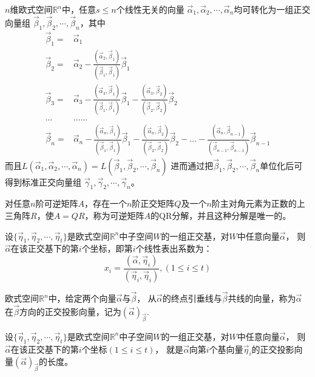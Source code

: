 \begin{thm}
$n$维欧式空间$\mathbb{R}^n$中，任意$s\leq n$个线性无关的向量
$\vec{\alpha}_1,\vec{\alpha}_2,\cdots,\vec{\alpha}_n$均可转化为一组正交向量组
$\vec{\beta}_1,\vec{\beta}_2,\cdots,\vec{\beta}_n$，其中
\begin{align*}
\vec{\beta}_1=&\vec{\alpha}_1\\
\vec{\beta}_2=&\vec{\alpha}_2-\frac{(\vec{\alpha}_2,\vec{\beta}_1)}{(\vec{\beta}_1,\vec{\beta}_1)}\vec{\beta}_1\\
\vec{\beta}_3=&\vec{\alpha}_3-\frac{(\vec{\alpha}_3,\vec{\beta}_1)}{(\vec{\beta}_1,\vec{\beta}_1)}\vec{\beta}_1-
              \frac{(\vec{\alpha}_3,\vec{\beta}_2)}{(\vec{\beta}_2,\vec{\beta}_2)}\vec{\beta}_2\\
\ldots&\ldots\ldots \\
\vec{\beta}_n=&\vec{\alpha}_n-\frac{(\vec{\alpha}_n,\vec{\beta}_1)}{(\vec{\beta}_1,\vec{\beta}_1)}\vec{\beta}_1
              -\frac{(\vec{\alpha}_n,\vec{\beta}_2)}{(\vec{\beta}_2,\vec{\beta}_2)}\vec{\beta}_2-\ldots
                -\frac{(\vec{\alpha}_n,\vec{\beta}_{n-1})}{(\vec{\beta}_{n-1},\vec{\beta}_{n-1})}\vec{\beta}_{n-1}
\end{align*}
而且$L(\vec{\alpha}_1,\vec{\alpha}_2,\cdots,\vec{\alpha}_n)=L(\vec{\beta}_1,\vec{\beta}_2,\cdots,\vec{\beta}_n)$
进而通过把$\vec{\beta}_1,\vec{\beta}_2,\cdots,\vec{\beta}_n$单位化后可得到标准正交向量组
$\vec{\gamma}_1,\vec{\gamma}_2,\cdots,\vec{\gamma}_n$。
\end{thm}

\begin{thm}
对任意$n$阶可逆矩阵$A$，存在一个$n$阶正交矩阵$Q$及一个$n$阶主对角元素为正数的上三角阵$R$，使$A=QR$，称为可逆矩阵$A$的QR分解，并且这种分解是唯一的。
\end{thm}

\begin{thm}
设$\{\vec{\eta}_1,\vec{\eta}_2,\cdots,\vec{\eta}_t\}$是欧式空间$\mathbb{R}^n$中子空间$W$的一组正交基，对$W$中任意向量$\vec{\alpha}$，
则$\vec{\alpha}$在该正交基下的第$i$个坐标，即第$i$个线性表出系数为：
\begin{equation*}
x_i=\frac{(\vec{\alpha},\vec{\eta}_i)}{(\vec{\eta}_i,\vec{\eta}_i)},
(1\leq i\leq t)
\end{equation*}
\end{thm}

\begin{Def}
欧式空间$\mathbb{R}^n$中，给定两个向量$\vec{\alpha}$与$\vec{\beta}$，
从$\vec{\alpha}$的终点引垂线与$\vec{\beta}$共线的向量，称为$\vec{\alpha}$
在$\vec{\beta}$方向的正交投影向量，记为$(\vec{\alpha})_{\vec{\beta}}$.
\end{Def}
\begin{thm}
设$\{\vec{\eta}_1,\vec{\eta}_2,\cdots,\vec{\eta}_t\}$是欧式空间$\mathbb{R}^n$中子空间$W$的一组正交基，对$W$中任意向量$\vec{\alpha}$，
则$\vec{\alpha}$在该正交基下的第$i$个坐标$(1\leq i\leq t)$，
就是$\vec{\alpha}$向第$i$个基向量$\vec{\eta}_i$的正交投影向量$(\vec{\alpha})_{\vec{\beta}}$的长度。
\end{thm}


